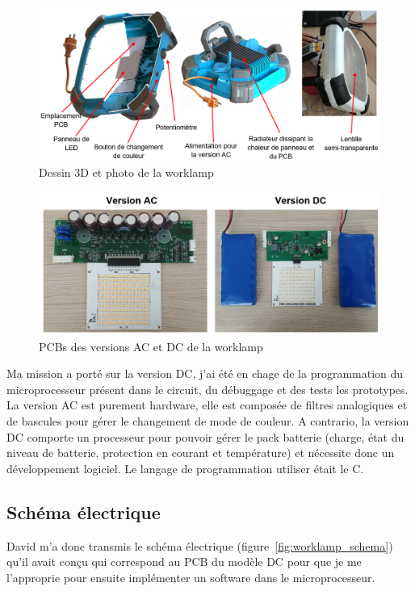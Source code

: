 \documentclass[a4paper, 11pt]{report}
\begin{document}
\begin{figure}[!h]
\begin{center}
\includegraphics[scale=0.45]{figures/screenshots/captioned_worklamp.png}
\end{center}
\caption{Dessin 3D et photo de la worklamp}
\label{fig:captioned_worklamp}
\end{figure}

\begin{figure}[!h]
\begin{center}
\includegraphics[scale=0.45]{figures/photos/worklamp_PCBs.jpg}
\end{center}
\caption{PCBs des versions AC et DC de la worklamp}
\label{fig:worklamp_PCBs}
\end{figure}

Ma mission a porté sur la version DC, j’ai été en chage de la programmation du microprocesseur présent dans le circuit, du débuggage et des tests les prototypes. La version AC est purement hardware, elle est composée de filtres analogiques et de bascules pour gérer le changement de mode de couleur. A contrario, la version DC comporte un processeur pour pouvoir gérer le pack batterie (charge, état du niveau de batterie, protection en courant et température) et nécessite donc un développement logiciel. Le langage de programmation utiliser était le C.

\subsection{Schéma électrique}
David m’a donc transmis le schéma électrique (figure~\ref{fig:worklamp_schema}) qu’il avait conçu qui correspond au PCB du modèle DC pour que je me l’approprie pour ensuite implémenter un software dans le microprocesseur.
\end{document}
